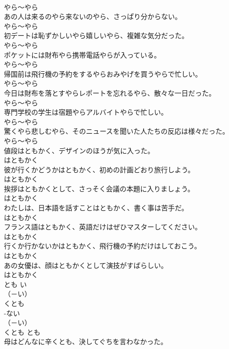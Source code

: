 \documentclass[8pt]{extreport}
\begin{document}
\begin{CJK}{UTF8}{min}
\\	やら～やら	
\\	あの人は来るのやら来ないのやら、さっぱり分からない。	
\\	やら～やら	
\\	初デートは恥ずかしいやら嬉しいやら、複雑な気分だった。	
\\	やら～やら	
\\	ポケットには財布やら携帯電話やらが入っている。	
\\	やら～やら	
\\	帰国前は飛行機の予約をするやらおみやげを買うやらで忙しい。	
\\	やら～やら	
\\	今日は財布を落とすやらレポートを忘れるやら、散々な一日だった。	
\\	やら～やら	
\\	専門学校の学生は宿題やらアルバイトやらで忙しい。	
\\	やら～やら	
\\	驚くやら悲しむやら、そのニュースを聞いた人たちの反応は様々だった。	
\\	やら～やら	
\\	値段はともかく、デザインのほうが気に入った。	
\\	はともかく	
\\	彼が行くかどうかはともかく、初めの計画どおり旅行しよう。	
\\	はともかく	
\\	挨拶はともかくとして、さっそく会議の本題に入りましょう。	
\\	はともかく	
\\	わたしは、日本語を話すことはともかく、書く事は苦手だ。	
\\	はともかく	
\\	フランス語はともかく、英語だけはぜひマスターしてください。	
\\	はともかく	
\\	行くか行かないかはともかく、飛行機の予約だけはしておこう。	
\\	はともかく	
\\	あの女優は、顔はともかくとして演技がすばらしい。	
\\	はともかく	
\\	とも	い
\\	（－い） 
\\	くとも	
\\	-ない
\\	（－い） 
\\	くとも	とも	
\\	母はどんなに辛くとも、決してぐちを言わなかった。	

\end{CJK}
\end{document}
